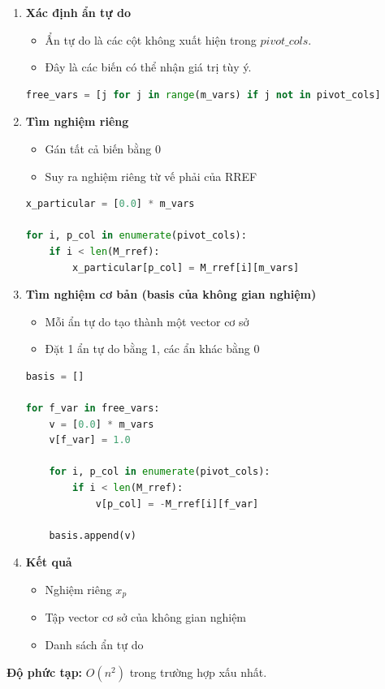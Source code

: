 \documentclass[a4paper,12pt]{report}
\begin{document}
\begin{enumerate}

\item \textbf{Xác định ẩn tự do}

\begin{itemize}
    \item Ẩn tự do là các cột không xuất hiện trong $pivot\_cols$.
    \item Đây là các biến có thể nhận giá trị tùy ý.
\end{itemize}

\begin{lstlisting}[language=Python, caption={Xác định ẩn tự do}]
free_vars = [j for j in range(m_vars) if j not in pivot_cols]
\end{lstlisting}

\item \textbf{Tìm nghiệm riêng}

\begin{itemize}
    \item Gán tất cả biến bằng 0
    \item Suy ra nghiệm riêng từ vế phải của RREF
\end{itemize}

\begin{lstlisting}[language=Python, caption={Tính nghiệm riêng}]
x_particular = [0.0] * m_vars

for i, p_col in enumerate(pivot_cols):
    if i < len(M_rref):
        x_particular[p_col] = M_rref[i][m_vars]
\end{lstlisting}

\item \textbf{Tìm nghiệm cơ bản (basis của không gian nghiệm)}

\begin{itemize}
    \item Mỗi ẩn tự do tạo thành một vector cơ sở
    \item Đặt 1 ẩn tự do bằng 1, các ẩn khác bằng 0
\end{itemize}

\begin{lstlisting}[language=Python, caption={Tạo vector cơ sở}]
basis = []

for f_var in free_vars:
    v = [0.0] * m_vars
    v[f_var] = 1.0

    for i, p_col in enumerate(pivot_cols):
        if i < len(M_rref):
            v[p_col] = -M_rref[i][f_var]

    basis.append(v)
\end{lstlisting}

\item \textbf{Kết quả}

\begin{itemize}
    \item Nghiệm riêng $x_p$
    \item Tập vector cơ sở của không gian nghiệm
    \item Danh sách ẩn tự do
\end{itemize}

\end{enumerate}
\textbf{Độ phức tạp:} $O(n^2)$ trong trường hợp xấu nhất.
\end{document}
